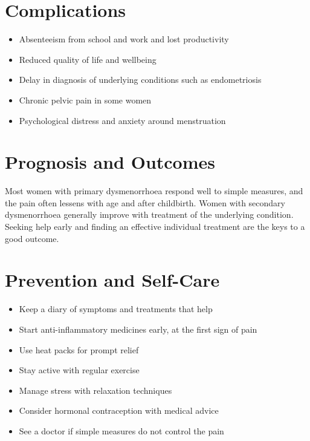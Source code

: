 \section*{Complications}
\begin{itemize}
    \item Absenteeism from school and work and lost productivity
    \item Reduced quality of life and wellbeing
    \item Delay in diagnosis of underlying conditions such as endometriosis
    \item Chronic pelvic pain in some women
    \item Psychological distress and anxiety around menstruation
\end{itemize}

\section*{Prognosis and Outcomes}
Most women with primary dysmenorrhoea respond well to simple measures, and the pain often lessens with age and after childbirth. Women with secondary dysmenorrhoea generally improve with treatment of the underlying condition. Seeking help early and finding an effective individual treatment are the keys to a good outcome.

\section*{Prevention and Self-Care}
\begin{itemize}
    \item Keep a diary of symptoms and treatments that help
    \item Start anti-inflammatory medicines early, at the first sign of pain
    \item Use heat packs for prompt relief
    \item Stay active with regular exercise
    \item Manage stress with relaxation techniques
    \item Consider hormonal contraception with medical advice
    \item See a doctor if simple measures do not control the pain
\end{itemize}


